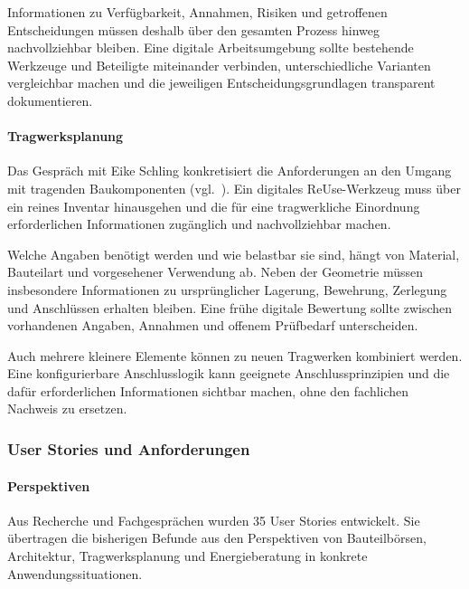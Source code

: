 \documentclass[type=zwischenbericht]{zukunftbau}
\begin{document}
\begin{SemioNest}
\begin{SemioNest}
Informationen zu Verfügbarkeit, Annahmen, Risiken und getroffenen Entscheidungen müssen deshalb über den gesamten Prozess hinweg nachvollziehbar bleiben. Eine digitale Arbeitsumgebung sollte bestehende Werkzeuge und Beteiligte miteinander verbinden, unterschiedliche Varianten vergleichbar machen und die jeweiligen Entscheidungsgrundlagen transparent dokumentieren.

\paragraph{Tragwerksplanung}
Das Gespräch mit Eike Schling konkretisiert die Anforderungen an den Umgang mit tragenden Baukomponenten (vgl.\ ). Ein digitales ReUse-Werkzeug muss über ein reines Inventar hinausgehen und die für eine tragwerkliche Einordnung erforderlichen Informationen zugänglich und nachvollziehbar machen.

Welche Angaben benötigt werden und wie belastbar sie sind, hängt von Material, Bauteilart und vorgesehener Verwendung ab. Neben der Geometrie müssen insbesondere Informationen zu ursprünglicher Lagerung, Bewehrung, Zerlegung und Anschlüssen erhalten bleiben. Eine frühe digitale Bewertung sollte zwischen vorhandenen Angaben, Annahmen und offenem Prüfbedarf unterscheiden.

Auch mehrere kleinere Elemente können zu neuen Tragwerken kombiniert werden. Eine konfigurierbare Anschlusslogik kann geeignete Anschlussprinzipien und die dafür erforderlichen Informationen sichtbar machen, ohne den fachlichen Nachweis zu ersetzen.
\end{SemioNest}
\end{SemioNest}

\subsubsection{User Stories und Anforderungen}
\paragraph{Perspektiven}
Aus Recherche und Fachgesprächen wurden 35 User Stories entwickelt. Sie übertragen die bisherigen Befunde aus den Perspektiven von Bauteilbörsen, Architektur, Tragwerksplanung und Energieberatung in konkrete Anwendungssituationen.
\end{document}

